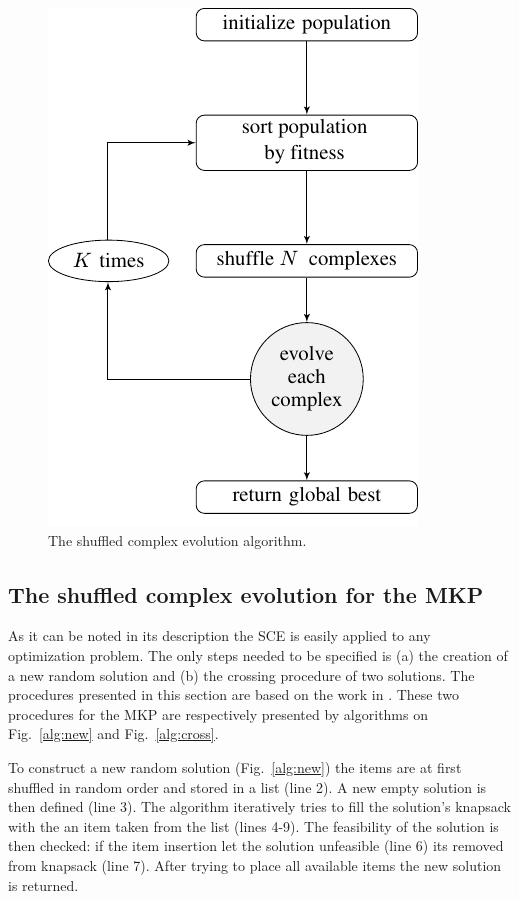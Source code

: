 \begin{figure}
  \includegraphics{imgs/flow1}
  \caption{The shuffled complex evolution algorithm.}
  \label{fig:flow1}
\end{figure}

\subsection{The shuffled complex evolution for the MKP}
\label{subsec:scemkp}

As it can be noted in its description the SCE is easily applied to any
optimization problem.
The only steps needed to be specified is (a) the creation of a new random
solution and (b) the crossing procedure of two solutions.
The procedures presented in this section are based
on the work in \cite{baroni2015shuffled}.
These two procedures for the MKP are respectively presented by algorithms on
Fig.~\ref{alg:new} and Fig.~\ref{alg:cross}.

To construct a new random solution (Fig.~\ref{alg:new}) the items are
at first shuffled in random order and stored in a list (line 2).
A new empty solution is then defined (line 3).
The algorithm iteratively tries to fill the solution's knapsack with 
the an item taken from the list (lines 4-9).
The feasibility of the solution is then checked: if the item insertion let
the solution unfeasible (line 6) its removed from knapsack (line 7).
After trying to place all available items the new solution is returned.

